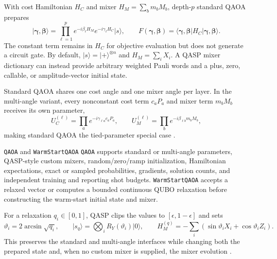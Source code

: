 \documentclass[10pt]{article}
\newcommand{\code}[1]{\texttt{#1}}
\begin{document}
With cost Hamiltonian $H_C$ and mixer
$H_M=\sum_b m_bM_b$, depth-$p$ standard QAOA prepares
\begin{equation}
  \lvert\bm\gamma,\bm\beta\rangle
  =\prod_{\ell=1}^{p}
     e^{-i\beta_\ell H_M}e^{-i\gamma_\ell H_C}
     \lvert s\rangle,
  \qquad
  F(\bm\gamma,\bm\beta)
  =\langle\bm\gamma,\bm\beta\rvert H_C
     \lvert\bm\gamma,\bm\beta\rangle.
  \label{eq:qaoa-state}
\end{equation}
The constant term remains in $H_C$ for objective evaluation but does not
generate a circuit gate.  By default, $\lvert s\rangle=\lvert+\rangle^{\otimes n}$
and $H_M=\sum_iX_i$.  A QASP mixer dictionary can instead provide arbitrary
weighted Pauli words and a plus, zero, callable, or amplitude-vector initial
state.

Standard QAOA shares one cost angle and one mixer angle per layer.  In the
multi-angle variant, every nonconstant cost term $c_aP_a$ and mixer term
$m_bM_b$ receives its own parameter,
\begin{equation}
 U_C^{(\ell)}=\prod_a e^{-i\gamma_{\ell a}c_aP_a},
 \qquad
 U_M^{(\ell)}=\prod_b e^{-i\beta_{\ell b}m_bM_b},
 \label{eq:multiangle-qaoa}
\end{equation}
making standard QAOA the tied-parameter special case
\cite{herrman2022multiangle}.

\begin{qaspfeature}{\code{QAOA} and \code{WarmStartQAOA}}
\code{QAOA} supports standard or multi-angle parameters, QASP-style custom
mixers, random/zero/ramp initialization, Hamiltonian expectations, exact or
sampled probabilities, gradients, solution counts, and independent training
and reporting shot budgets.  \code{WarmStartQAOA} accepts a relaxed vector or
computes a bounded continuous QUBO relaxation before constructing the
warm-start initial state and mixer.
\end{qaspfeature}

For a relaxation $q_i\in[0,1]$, QASP clips the values to
$[\epsilon,1-\epsilon]$ and sets
\begin{equation}
  \vartheta_i=2\arcsin\sqrt{q_i},\qquad
  \lvert s_q\rangle=\bigotimes_iR_Y(\vartheta_i)\lvert0\rangle,
  \qquad
  H_M^{(q)}=-\sum_i\left(
    \sin\vartheta_iX_i+\cos\vartheta_iZ_i\right).
  \label{eq:warm-start-qaoa}
\end{equation}
This preserves the standard and multi-angle interfaces while changing both
the prepared state and, when no custom mixer is supplied, the mixer evolution
\cite{egger2021warm}.
\end{document}

